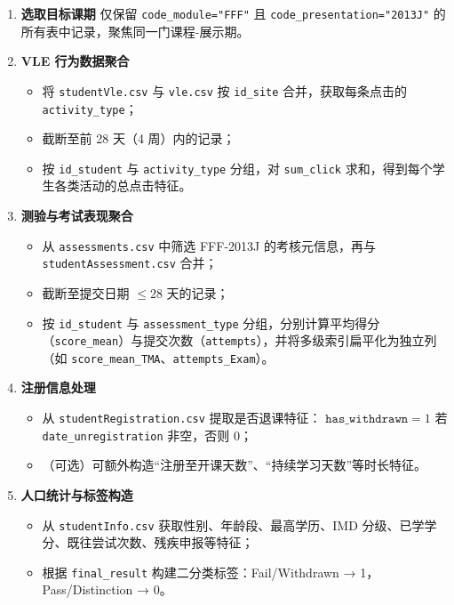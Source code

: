 \documentclass{SYSUReport}
\begin{document}
\begin{enumerate}[1.]
  \item \textbf{选取目标课期}  
    仅保留 \texttt{code\_module="FFF"} 且 \texttt{code\_presentation="2013J"} 的所有表中记录，聚焦同一门课程-展示期。

  \item \textbf{VLE 行为数据聚合}  
    \begin{itemize}
      \item 将 \texttt{studentVle.csv} 与 \texttt{vle.csv} 按 \texttt{id\_site} 合并，获取每条点击的 \texttt{activity\_type}；  
      \item 截断至前 28 天（4 周）内的记录；  
      \item 按 \texttt{id\_student} 与 \texttt{activity\_type} 分组，对 \texttt{sum\_click} 求和，得到每个学生各类活动的总点击特征。
    \end{itemize}

  \item \textbf{测验与考试表现聚合}  
    \begin{itemize}
      \item 从 \texttt{assessments.csv} 中筛选 FFF-2013J 的考核元信息，再与 \texttt{studentAssessment.csv} 合并；  
      \item 截断至提交日期 \(\le28\) 天的记录；  
      \item 按 \texttt{id\_student} 与 \texttt{assessment\_type} 分组，分别计算平均得分（\texttt{score\_mean}）与提交次数（\texttt{attempts}），并将多级索引扁平化为独立列（如 \texttt{score\_mean\_TMA}、\texttt{attempts\_Exam}）。
    \end{itemize}

  \item \textbf{注册信息处理}  
    \begin{itemize}
      \item 从 \texttt{studentRegistration.csv} 提取是否退课特征：  
        \(\texttt{has\_withdrawn}=1\) 若 \texttt{date\_unregistration} 非空，否则 0；  
      \item （可选）可额外构造“注册至开课天数”、“持续学习天数”等时长特征。
    \end{itemize}

  \item \textbf{人口统计与标签构造}  
    \begin{itemize}
      \item 从 \texttt{studentInfo.csv} 获取性别、年龄段、最高学历、IMD 分级、已学学分、既往尝试次数、残疾申报等特征；  
      \item 根据 \texttt{final\_result} 构建二分类标签：Fail/Withdrawn → 1，Pass/Distinction → 0。
    \end{itemize}


\end{enumerate}
\end{document}
